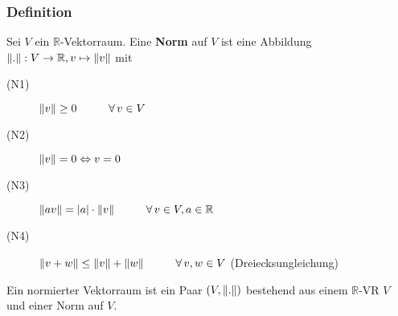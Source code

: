 \subsubsection{Definition} %
\label{ssub:definition}
Sei $ V$ ein $\mathbb{R} $-Vektorraum. Eine {\bfseries Norm} auf $ V$ ist eine Abbildung $\norm{.}:V \to \mathbb{R} , v \mapsto \norm{v}$ mit
\begin{description}
	\item[(N1)]$\norm{v} \geq 0 \hspace{1cm} \forall \, v \in V$ 
	\item[(N2)] $\norm{v}=0 \Leftrightarrow v=0$
	\item[(N3)] $\norm{av}=|a|\cdot \norm{v} \hspace{1cm}  \forall\,v \in V, a \in \mathbb{R}$
	\item[(N4)] $\norm{v+w} \leq \norm{v}+\norm{w} \hspace{1cm} \forall\, v,w \in V$ \hspace{1cm} (Dreiecksungleichung) 
\end{description} 
Ein normierter Vektorraum ist ein Paar $(V,\norm{.})$ bestehend aus einem $\mathbb{R}$-VR $ V$ und einer Norm auf $ V$.

